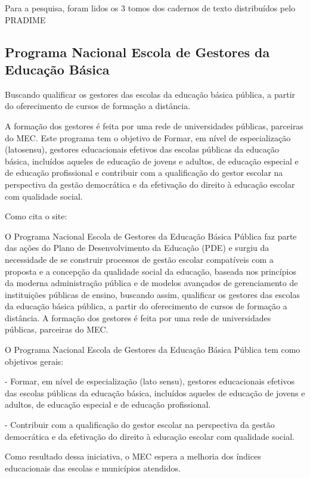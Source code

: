 \documentclass[
	12pt,				%
	openright,			%
	oneside,
	a4paper,			%
	chapter=TITLE,		%
	section=TITLE,		%
	sumario=abnt-6027-2012,
	english,			%
	brazil				%
]{abntex2}
\begin{document}
		Para a pesquisa, foram lidos os 3 tomos dos cadernos de texto distribuídos pelo PRADIME \nocite{PRADIME01} \nocite{PRADIME02} \nocite{PRADIME03}
		
		\subsection{Programa Nacional Escola de Gestores da Educação Básica}

		Buscando   qualificar   os   gestores   das   escolas   da   educação   básica   pública,   a partir   do   oferecimento   de   cursos   de   formação   a   distância.   
		
		A   formação   dos gestores   é   feita   por   uma   rede   de   universidades   públicas,   parceiras   do   MEC. Este   programa   tem   o   objetivo   de   Formar,   em   nível   de   especialização   (latosensu),   gestores   educacionais   efetivos   das   escolas   públicas   da   educação básica,   incluídos   aqueles   de   educação   de   jovens   e   adultos,   de   educação especial   e   de   educação   profissional   e   contribuir   com   a   qualificação   do   gestor escolar   na   perspectiva   da   gestão   democrática   e   da   efetivação   do   direito   à educação escolar com qualidade social.
		
		Como cita o site:
		
		\begin{citacao}
			O Programa Nacional Escola de Gestores da Educação Básica Pública faz parte das ações do Plano de Desenvolvimento da Educação (PDE) e surgiu da necessidade de se construir processos de gestão escolar compatíveis com a proposta e a concepção da qualidade social da educação, baseada nos princípios da moderna administração pública e de modelos avançados de gerenciamento de instituições públicas de ensino, buscando assim, qualificar os gestores das escolas da educação básica pública, a partir do oferecimento de cursos de formação a distância. A formação dos gestores é feita por uma rede de universidades públicas, parceiras do MEC.
			
			O Programa Nacional Escola de Gestores da Educação Básica Pública tem como objetivos gerais:
			
			- Formar, em nível de especialização (lato sensu), gestores educacionais efetivos das escolas públicas da educação básica, incluídos aqueles de educação de jovens e adultos, de educação especial e de educação profissional.
			
			- Contribuir com a qualificação do gestor escolar na perspectiva da gestão democrática e da efetivação do direito à educação escolar com qualidade social.
			
			Como resultado dessa iniciativa, o MEC espera a melhoria dos índices educacionais das escolas e municípios atendidos.
		\end{citacao}
\end{document}
